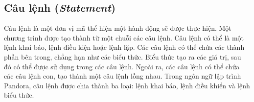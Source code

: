 \subsection{Câu lệnh (\textit{Statement})}

\regexstmt

Câu lệnh là một đơn vị mã thể hiện một hành động sẽ được thực hiện. Một chương trình được tạo thành từ một chuỗi các câu lệnh. Câu lệnh có thể là một lệnh khai báo, lệnh điều kiện hoặc lệnh lặp. Các câu lệnh có thể chứa các thành phần bên trong, chẳng hạn như các biểu thức. Biểu thức tạo ra các giá trị, sau đó có thể được sử dụng trong các câu lệnh. Ngoài ra, các câu lệnh có thể chứa các câu lệnh con, tạo thành một câu lệnh lồng nhau. Trong ngôn ngữ lập trình Pandora, câu lệnh được chia thành ba loại: lệnh khai báo, lệnh điều khiển và lệnh biểu thức.





